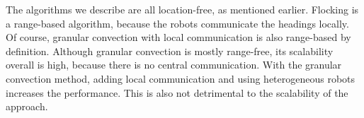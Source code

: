 The algorithms we describe are all location-free, as mentioned earlier. 
Flocking is a range-based algorithm, because the robots communicate the headings locally. 
Of course, granular convection with local communication is also range-based by definition. 
Although granular convection is mostly range-free, its scalability overall is high, because there is no central communication. 
With the granular convection method, adding local communication and using heterogeneous robots increases the performance.
This is also not detrimental to the scalability of the approach. 

  \begin{table}[H]
  \renewcommand{\arraystretch}{1.3}
  \centering
{}
    \caption{Overview of Collective Transport Algorithms}
  \label{table_alg_coltrans2}
  \end{table}



